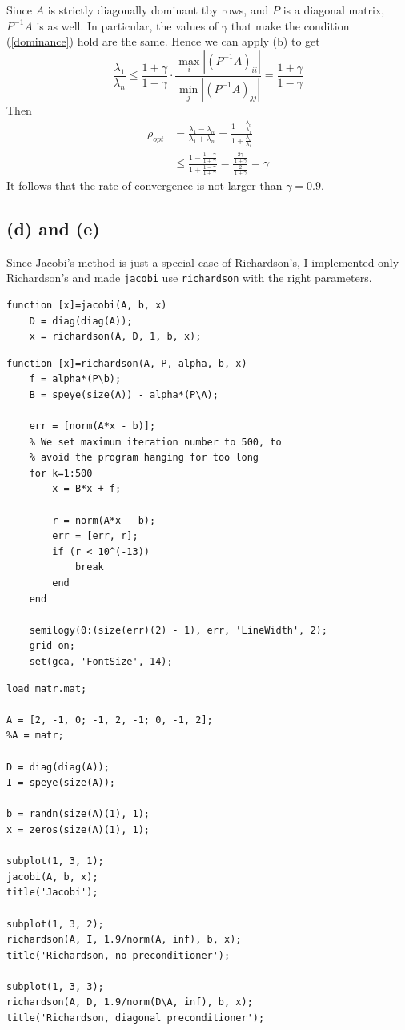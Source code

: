 \documentclass{article}
\begin{document}
Since $A$ is strictly diagonally dominant tby rows, and $P$ is a
diagonal matrix, $P^{-1}A$ is as well. In particular, the values
of $\gamma$ that make the condition (\ref{dominance}) hold
are the same. Hence we can apply (b) to get
\begin{equation*}
	\frac{\lambda_1}{\lambda_n} 
	\leq \frac{1 + \gamma}{1 - \gamma}\cdot
	\frac{\max_i|(P^{-1}A)_{ii}|}{\min_j|(P^{-1}A)_{jj}|}
	= \frac{1 + \gamma}{1- \gamma}
\end{equation*}
Then
\begin{align*}
	\rho_{opt} &=\frac{\lambda_1 - \lambda_n}
	{\lambda_1 + \lambda_n}
	= \frac{1 - \frac{\lambda_n}{\lambda_1}}
	{1 + \frac{\lambda_n}{\lambda_1}}\\
	&\leq \frac{1 - \frac{1 - \gamma}{1 + \gamma}}
	{1 + \frac{1 - \gamma}{1+\gamma}}
	= \frac{\frac{2\gamma}{1+\gamma}}{\frac{2}{1 + \gamma}} = \gamma
\end{align*}
It follows that the rate of convergence is not larger than
$\gamma = 0.9$.

\subsection*{(d) and (e)}

Since Jacobi's method is just a special case of Richardson's,
I implemented only Richardson's and made \texttt{jacobi} use
\texttt{richardson} with the right parameters.
\begin{Verbatim}[frame=single,
	label=\textsc{Matlab} code - jacobi.m]
function [x]=jacobi(A, b, x)
	D = diag(diag(A));
	x = richardson(A, D, 1, b, x);
\end{Verbatim}

\begin{Verbatim}[frame=single,
	label=\textsc{Matlab} code - richardson.m]
function [x]=richardson(A, P, alpha, b, x)
	f = alpha*(P\b);
	B = speye(size(A)) - alpha*(P\A);

	err = [norm(A*x - b)];
	% We set maximum iteration number to 500, to
	% avoid the program hanging for too long
	for k=1:500
		x = B*x + f;

		r = norm(A*x - b);
		err = [err, r];
		if (r < 10^(-13))
			break
		end
	end

	semilogy(0:(size(err)(2) - 1), err, 'LineWidth', 2);
	grid on;
	set(gca, 'FontSize', 14);
\end{Verbatim}

\begin{Verbatim}[frame=single,
	label=\textsc{Matlab} code - main.m]
load matr.mat;

A = [2, -1, 0; -1, 2, -1; 0, -1, 2];
%A = matr;

D = diag(diag(A));
I = speye(size(A));

b = randn(size(A)(1), 1);
x = zeros(size(A)(1), 1);

subplot(1, 3, 1);
jacobi(A, b, x);
title('Jacobi');

subplot(1, 3, 2);
richardson(A, I, 1.9/norm(A, inf), b, x);
title('Richardson, no preconditioner');

subplot(1, 3, 3);
richardson(A, D, 1.9/norm(D\A, inf), b, x);
title('Richardson, diagonal preconditioner');
\end{Verbatim}
\end{document}
